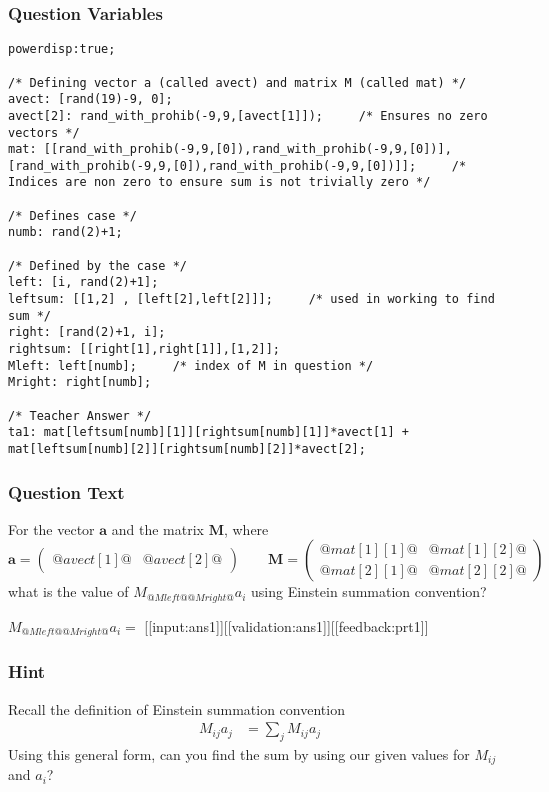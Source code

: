 \documentclass[a4paper,10pt]{article}
\begin{document}
\subsubsection{Question Variables}
\begin{lstlisting}
powerdisp:true;

/* Defining vector a (called avect) and matrix M (called mat) */
avect: [rand(19)-9, 0];
avect[2]: rand_with_prohib(-9,9,[avect[1]]);     /* Ensures no zero vectors */
mat: [[rand_with_prohib(-9,9,[0]),rand_with_prohib(-9,9,[0])],[rand_with_prohib(-9,9,[0]),rand_with_prohib(-9,9,[0])]];     /* Indices are non zero to ensure sum is not trivially zero */

/* Defines case */
numb: rand(2)+1;

/* Defined by the case */
left: [i, rand(2)+1];     
leftsum: [[1,2] , [left[2],left[2]]];     /* used in working to find sum */
right: [rand(2)+1, i];
rightsum: [[right[1],right[1]],[1,2]];
Mleft: left[numb];     /* index of M in question */
Mright: right[numb];

/* Teacher Answer */
ta1: mat[leftsum[numb][1]][rightsum[numb][1]]*avect[1] + mat[leftsum[numb][2]][rightsum[numb][2]]*avect[2];
\end{lstlisting}
\subsubsection{Question Text}
For the vector \(\textbf{a}\) and the matrix \(\textbf{M}\), where \[ \textbf{a} = \left(\begin{matrix} @avect[1]@ & @avect[2]@ \end{matrix}\right) \qquad \textbf{M} = \left( \begin{matrix} @mat[1][1]@ & @mat[1][2]@ \\ @mat[2][1]@ & @mat[2][2]@ \end{matrix} \right) \] what is the value of \(M_{@Mleft@ @Mright@}a_{i}\) using Einstein summation convention?

\(M_{@Mleft@ @Mright@}a_{i} = \) [[input:ans1]][[validation:ans1]][[feedback:prt1]]
\subsubsection{Hint}
Recall the definition of Einstein summation convention \begin{align*} M_{ij}a_{j} &=\sum_{j} M_{ij}a_{j} \end{align*} Using this general form, can you find the sum by using our given values for \(M_{ij}\) and \(a_{i}\)?
\end{document}
